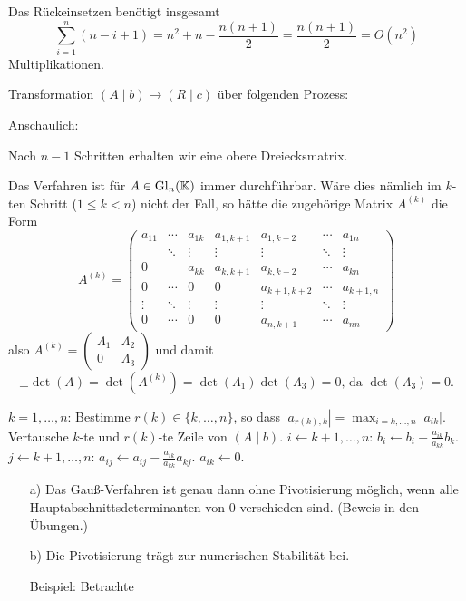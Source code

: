 Das Rückeinsetzen benötigt insgesamt \[
  \sum_{i=1}^n (n - i + 1) = n^2 + n - \frac{n(n+1)}{2} = \frac{n(n+1)}{2}
    = O(n^2)
\] Multiplikationen.

Transformation $(A \mid b) \to (R \mid c)$ über folgenden Prozess:

Anschaulich: %

Nach $n-1$ Schritten erhalten wir eine obere Dreiecksmatrix.

\begin{Bemerkung}
Das Verfahren ist für $A \in \mathrm{Gl}_n(\mathbb K)$ immer durchführbar.
Wäre dies nämlich im $k$-ten Schritt ($1 \le k < n$) nicht der Fall, so
hätte die zugehörige Matrix $A^{(k)}$ die Form \[
  A^{(k)} = \left( \begin{array}{ccc|cccc}
  a_{11} & \cdots & a_{1k} & a_{1,k+1} & a_{1,k+2} & \cdots & a_{1n} \\
  & \ddots & \vdots & \vdots & \vdots & \ddots & \vdots \\
  0 & & a_{kk} & a_{k,k+1} & a_{k,k+2} & \cdots & a_{kn} \\ \hline
  0 & \cdots & 0 & 0 & a_{k+1,k+2} & \cdots & a_{k+1,n} \\
  \vdots & \ddots & \vdots & \vdots & \vdots & \ddots &  \vdots \\
  0 & \cdots & 0 & 0 & a_{n,k+1} & \cdots & a_{nn}
  \end{array} \right)
\] also \(
  A^{(k)} = \left( \begin{array}{c|c} \Lambda_1 & \Lambda_2 \\\hline 0 & \Lambda_3 \end{array} \right)
\) und damit
$$\pm \det(A) = \det(A^{(k)}) = \det(\Lambda_1) \det(\Lambda_3) = 0\text{, da }\det (\Lambda_3) = 0.$$
\end{Bemerkung}

\begin{Algorithmus}
\quad
\begin{codebox}
\li \For $k = 1, \ldots, n$:
\Do
  \li Bestimme $r(k) \in \{k, \ldots, n\}$, so dass
      $|a_{r(k),k}| = \max_{i=k,\ldots,n} |a_{ik}|.$
  \li Vertausche $k$-te und $r(k)$-te Zeile von $(A \mid b)$.
  \li \For $i \gets k + 1, \ldots, n$:
  \Do
    \li $b_i \gets b_i - \frac{a_{ik}}{a_{kk}} b_k$.
    \li \For $j \gets k+1, \ldots, n$:
    \Do
      \li $a_{ij} \gets a_{ij} - \frac{a_{ik}}{a_{kk}} a_{kj}$.
    \End
    \li $a_{ik} \gets 0$.
  \End
\End
\end{codebox}
\end{Algorithmus}

\begin{Bemerkungen}
\begin{itemize}
  \item[a)] Das Gauß-Verfahren ist genau dann ohne Pivotisierung möglich,
    wenn alle Hauptabschnittsdeterminanten von 0 verschieden sind. (Beweis in den Übungen.)

  \item[b)] Die Pivotisierung trägt zur numerischen Stabilität bei.

  Beispiel: Betrachte 
\end{itemize}
\end{Bemerkungen}